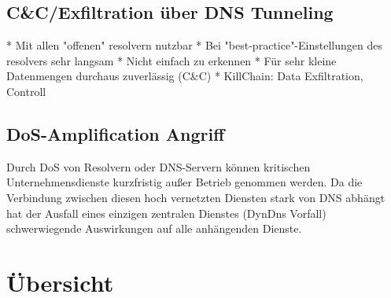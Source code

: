 \subsection{C\&C/Exfiltration über DNS Tunneling}


\begin{draft}
  \begin{markdown}
* Mit allen "offenen" resolvern nutzbar
* Bei "best-practice"-Einstellungen des resolvers sehr langsam
* Nicht einfach zu erkennen
* Für sehr kleine Datenmengen durchaus zuverlässig (C&C)
* KillChain: Data Exfiltration, Controll
\end{markdown}
\end{draft}

\subsection{DoS-Amplification Angriff}
\label{sec:attack-dosamp}


\begin{draft}
Durch DoS von Resolvern oder DNS-Servern können kritischen Unternehmensdienste kurzfristig außer Betrieb genommen werden. Da die Verbindung zwischen diesen hoch vernetzten Diensten stark von DNS abhängt hat der Ausfall eines einzigen zentralen Dienstes (DynDns Vorfall) schwerwiegende Auswirkungen auf alle anhängenden Dienste.
\end{draft}


\section{Übersicht}
\label{sec:Attacks-Summary}

